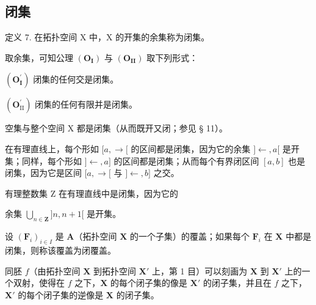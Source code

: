 \subsection{闭集}

定义 7. 在拓扑空间 X 中，X 的开集的余集称为闭集。

取余集，可知公理 \((\mathbf{O}_{\mathbf{I}})\) 与 \((\mathbf{O}_{\mathbf{II}})\) 取下列形式：

\((\mathbf{O}_{\mathbf{I}}^{\prime})\) 闭集的任何交是闭集。

\((\mathbf{O}_{\mathrm{II}}^{\prime})\) 闭集的任何有限并是闭集。

空集与整个空间 X 都是闭集（从而既开又闭；参见 § 11）。

在有理直线上，每个形如 \([a, \rightarrow[\) 的区间都是闭集，因为它的余集 \(]\leftarrow, a[\) 是开集；同样，每个形如 \(]\leftarrow, a]\) 的区间都是闭集；从而每个有界闭区间 \([a, b]\) 也是闭集，因为它是区间 \([a, \rightarrow[\) 与 \(]\leftarrow, b]\) 之交。

有理整数集 Z 在有理直线中是闭集，因为它的

余集 \(\bigcup_{n\in \mathbf{Z}}]n,n + 1[\) 是开集。

设 \((\mathbf{F}_i)_{i\in I}\) 是 \(\mathbf{A}\)（拓扑空间 \(\mathbf{X}\) 的一个子集）的覆盖；如果每个 \(\mathbf{F}_i\) 在 \(\mathbf{X}\) 中都是闭集，则称该覆盖为闭覆盖。

同胚 \(f\)（由拓扑空间 \(\mathbf{X}\) 到拓扑空间 \(\mathbf{X}'\) 上，第 1 目）可以刻画为 \(\mathbf{X}\) 到 \(\mathbf{X}'\) 上的一个双射，使得在 \(f\) 之下，\(\mathbf{X}\) 的每个闭子集的像是 \(\mathbf{X}'\) 的闭子集，并且在 \(f\) 之下，\(\mathbf{X}'\) 的每个闭子集的逆像是 \(\mathbf{X}\) 的闭子集。

